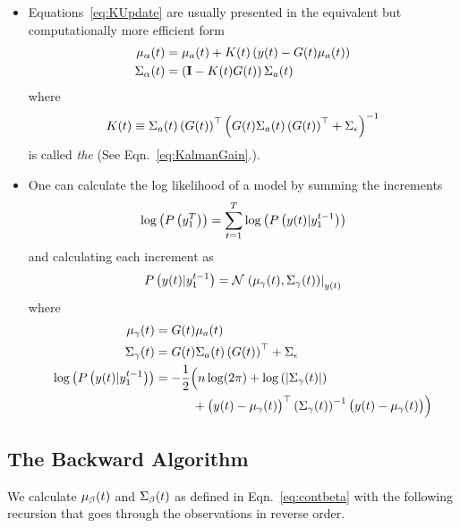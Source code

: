 \begin{itemize}
\item Equations~\eqref{eq:KUpdate} are usually presented in the
  equivalent but computationally more efficient form
  \begin{align*}
    {\mu_\alpha}{(t)} &= {\mu_a}{(t)} + {K}{(t)} \left( {y}{(t)} -
    {G}{(t)} {\mu_a}{(t)} \right) \\
    {\Sigma_\alpha}{(t)} &= \left( {\bf I} - {K}{(t)} {G}{(t)} \right) {\Sigma_a}{(t)} 
  \end{align*}
  where
  \begin{equation*}
    {K}{(t)} \equiv {\Sigma_a}{(t)} \left( {G}{(t)} \right)^\top \left( {G}{(t)} {\Sigma_a}{(t)} \left( {G}{(t)} \right)^\top + \Sigma_\epsilon \right)^{-1}
  \end{equation*}
  is called \emph{the } %
  (See Eqn.~\eqref{eq:KalmanGain}.).
\item One can calculate the log likelihood of a model by summing the
  increments
  \begin{equation*}
    \log\left( P\left(y_{1}^{T} \right)\right) = \sum_{t=1}^T
    \log\left(P \left({y}{(t)}|y_{1}^{t-1} \right) \right)
  \end{equation*}
  and calculating each increment as
  \begin{equation*}
    P \left({y}{(t)}|y_{1}^{t-1} \right) =
    {\mathcal{N}}\left.\left({\mu_\gamma}{(t)},{\Sigma_\gamma}{(t)}\right)\right|_{{y}{(t)}}
  \end{equation*}
  where
  \begin{align*}
    {\mu_\gamma}{(t)} &= {G}{(t)} {\mu_a}{(t)}\\
    {\Sigma_\gamma}{(t)} &= {G}{(t)} {\Sigma_a}{(t)} \left(
    {G}{(t)} \right)^\top + \Sigma_\epsilon\\
    \log\left( P \left({y}{(t)}|y_{1}^{t-1} \right) \right) &= -
    \frac{1}{2} \Big( n \log(2\pi) + \log \left( \left|
    {\Sigma_\gamma}{(t)} \right| \right) \\ & \quad \quad \quad
    + \big( {y}{(t)} - {\mu_\gamma}{(t)} \big)^\top
    \left( {\Sigma_\gamma}{(t)} \right)^{-1}
    \big( {y}{(t)} - {\mu_\gamma}{(t)} \big)
    \Big)
  \end{align*}
\end{itemize}

\subsection{The Backward Algorithm}

We calculate ${\mu_\beta}{(t)}$ and ${\Sigma_\beta}{(t)}$ as defined
in Eqn.~\eqref{eq:contbeta} with the following recursion that goes
through the observations in reverse order.

